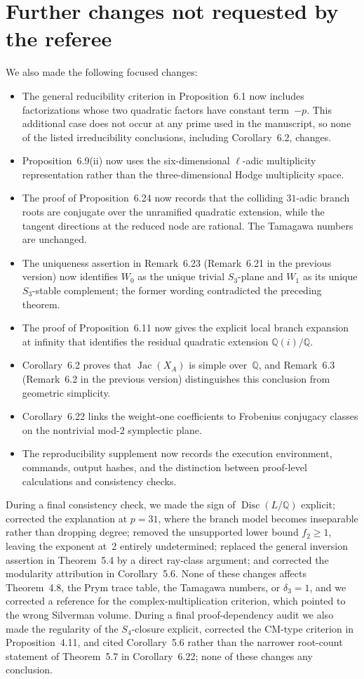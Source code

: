 \documentclass[11pt,letterpaper]{article}
\newcommand{\QQ}{\mathbb{Q}}
\newcommand{\Jac}{\operatorname{Jac}}
\begin{document}
\section*{Further changes not requested by the referee}

We also made the following focused changes:
\begin{itemize}
\item The general reducibility criterion in Proposition~6.1 now includes factorizations whose two quadratic factors have constant term~\(-p\). This additional case does not occur at any prime used in the manuscript, so none of the listed irreducibility conclusions, including Corollary~6.2, changes.
\item Proposition~6.9(ii) now uses the six-dimensional \(\ell\)-adic multiplicity representation rather than the three-dimensional Hodge multiplicity space.
\item The proof of Proposition~6.24 now records that the colliding \(31\)-adic branch roots are conjugate over the unramified quadratic extension, while the tangent directions at the reduced node are rational. The Tamagawa numbers are unchanged.
\item The uniqueness assertion in Remark~6.23 (Remark~6.21 in the previous version) now identifies \(W_0\) as the unique trivial \(S_3\)-plane and \(W_1\) as its unique \(S_3\)-stable complement; the former wording contradicted the preceding theorem.
\item The proof of Proposition~6.11 now gives the explicit local branch expansion at infinity that identifies the residual quadratic extension \(\QQ(i)/\QQ\).
\item Corollary~6.2 proves that \(\Jac(X_A)\) is simple over~\(\QQ\), and Remark~6.3 (Remark~6.2 in the previous version) distinguishes this conclusion from geometric simplicity.
\item Corollary~6.22 links the weight-one coefficients to Frobenius conjugacy classes on the nontrivial mod-\(2\) symplectic plane.
\item The reproducibility supplement now records the execution environment, commands, output hashes, and the distinction between proof-level calculations and consistency checks.
\end{itemize}

During a final consistency check, we made the sign of \(\operatorname{Disc}(L/\QQ)\) explicit; corrected the explanation at \(p=31\), where the branch model becomes inseparable rather than dropping degree; removed the unsupported lower bound \(f_2\geq1\), leaving the exponent at~2 entirely undetermined; replaced the general inversion assertion in Theorem~5.4 by a direct ray-class argument; and corrected the modularity attribution in Corollary~5.6. None of these changes affects Theorem~4.8, the Prym trace table, the Tamagawa numbers, or \(\delta_3=1\), and we corrected a reference for the complex-multiplication criterion, which pointed to the wrong Silverman volume. During a final proof-dependency audit we also made the regularity of the \(S_4\)-closure explicit, corrected the CM-type criterion in Proposition~4.11, and cited Corollary~5.6 rather than the narrower root-count statement of Theorem~5.7 in Corollary~6.22; none of these changes any conclusion.
\end{document}
